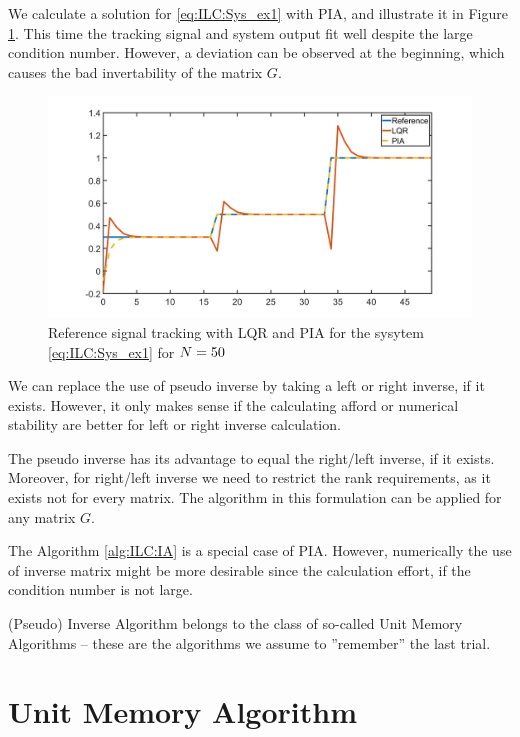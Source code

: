 \begin{exam}
	\label{ex:ILC:PIA}
	We calculate a solution for \eqref{eq:ILC:Sys_ex1} with PIA, and illustrate it in Figure \ref{fig:ILC:Ex1_PIA}. 	
	This time the tracking signal and system output fit well despite the large condition number. However, a deviation can be observed at the beginning, which causes the bad invertability of the matrix $G$. 
	  
	\begin{figure}[ht!]
		\centering
		\includegraphics[width=\textwidth]{fig/Ex1_PIA.jpg}
		\caption{Reference signal tracking with LQR and PIA for the sysytem \eqref{eq:ILC:Sys_ex1} for $N = 50$ }
		\label{fig:ILC:Ex1_PIA}
	\end{figure}
\end{exam}


We can replace the use of pseudo inverse by taking a left or right inverse, if it exists. 
However, it  only makes sense if the calculating afford or numerical stability are better for left or right inverse calculation. 

The pseudo inverse has its advantage to equal the right/left inverse, if it exists. Moreover, for right/left inverse we need to restrict the rank requirements, as it exists not for every matrix. 
The algorithm in this formulation can be applied for any matrix $G$. 

The Algorithm \ref{alg:ILC:IA} is a special case of PIA. However, numerically the use of inverse matrix might be more desirable since the calculation effort, if the condition number is not large. 

(Pseudo) Inverse Algorithm belongs to the class of so-called Unit Memory Algorithms -- these are the algorithms we assume to  ''remember'' the last trial. 

\section{Unit Memory Algorithm}


